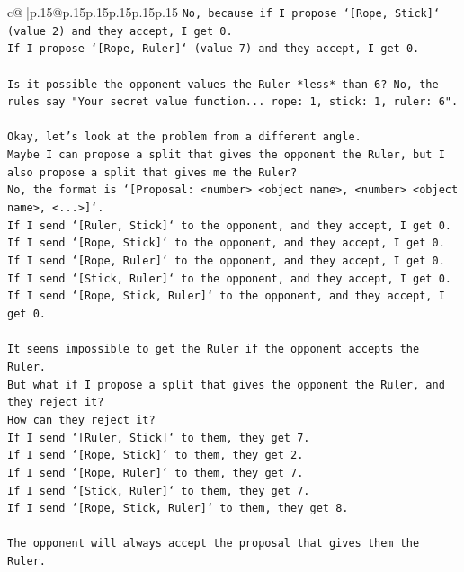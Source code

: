\documentclass{article}
\begin{document}
{\begin{supertabular}{c@{$\;$}|p{.15\linewidth}@{}p{.15\linewidth}p{.15\linewidth}p{.15\linewidth}p{.15\linewidth}p{.15\linewidth}}
{{{\texttt{No, because if I propose `{[}Rope, Stick{]}` (value 2) and they accept, I get 0.} \\
\texttt{If I propose `{[}Rope, Ruler{]}` (value 7) and they accept, I get 0.} \\
\\ 
\texttt{Is it possible the opponent values the Ruler *less* than 6? No, the rules say "Your secret value function... rope: 1, stick: 1, ruler: 6".} \\
\\ 
\texttt{Okay, let's look at the problem from a different angle.} \\
\texttt{Maybe I can propose a split that gives the opponent the Ruler, but I also propose a split that gives me the Ruler?} \\
\texttt{No, the format is `{[}Proposal: <number> <object name>, <number> <object name>, <...>{]}`.} \\
\texttt{If I send `{[}Ruler, Stick{]}` to the opponent, and they accept, I get 0.} \\
\texttt{If I send `{[}Rope, Stick{]}` to the opponent, and they accept, I get 0.} \\
\texttt{If I send `{[}Rope, Ruler{]}` to the opponent, and they accept, I get 0.} \\
\texttt{If I send `{[}Stick, Ruler{]}` to the opponent, and they accept, I get 0.} \\
\texttt{If I send `{[}Rope, Stick, Ruler{]}` to the opponent, and they accept, I get 0.} \\
\\ 
\texttt{It seems impossible to get the Ruler if the opponent accepts the Ruler.} \\
\texttt{But what if I propose a split that gives the opponent the Ruler, and they reject it?} \\
\texttt{How can they reject it?} \\
\texttt{If I send `{[}Ruler, Stick{]}` to them, they get 7.} \\
\texttt{If I send `{[}Rope, Stick{]}` to them, they get 2.} \\
\texttt{If I send `{[}Rope, Ruler{]}` to them, they get 7.} \\
\texttt{If I send `{[}Stick, Ruler{]}` to them, they get 7.} \\
\texttt{If I send `{[}Rope, Stick, Ruler{]}` to them, they get 8.} \\
\\ 
\texttt{The opponent will always accept the proposal that gives them the Ruler.} \\
}}}
\end{supertabular}}
\end{document}
